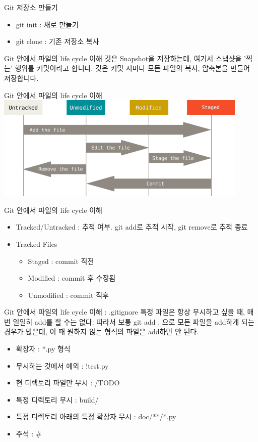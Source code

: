 \documentclass{beamer}
\begin{document}
\begin{frame}{Git 저장소 만들기}

\begin{itemize} 
\item git init : 새로 만들기 
\item git clone : 기존 저장소 복사 
\end{itemize}
\end{frame}

\begin{frame}{Git 안에서 파일의 life cycle 이해}
깃은 Snapshot을 저장하는데, 여기서 스냅샷을 '찍는' 행위를 커밋이라고 합니다. 
깃은 커밋 시마다 모든 파일의 복사, 압축본을 만들어 저장합니다. 
\end{frame}
\begin{frame}{Git 안에서 파일의 life cycle 이해}
\includegraphics[height=5cm,keepaspectratio]{lifecycle}
\end{frame}

\begin{frame}{Git 안에서 파일의 life cycle 이해}
\begin{itemize} 
\item Tracked/Untracked : 추적 여부. git add로 추적 시작, git remove로 추적 종료
\item Tracked Files
\begin{itemize} 
\item Staged : commit 직전
\item Modified : commit 후 수정됨
\item Unmodified : commit 직후
\end{itemize}
\end{itemize}
\end{frame}


\begin{frame}{Git 안에서 파일의 life cycle 이해 : .gitignore}
특정 파일은 항상 무시하고 싶을 때, 매번 일일히 add를 할 수는 없다. 따라서 보통 git add . 으로 모든 파일을 add하게 되는 경우가 많은데, 이 때 원하지 않는 형식의 파일은 add하면 안 된다. 
\begin{itemize} 
\item 확장자 : *.py 형식 
\item 무시하는 것에서 예외 : !test.py 
\item 현 디렉토리 파일만 무시 : /TODO
\item 특정 디렉토리 무시 : build/
\item 특정 디렉토리 아래의 특정 확장자 무시 : doc/**/*.py
\item 주석 : \# 
\end{itemize}
\end{frame}
\end{document}
